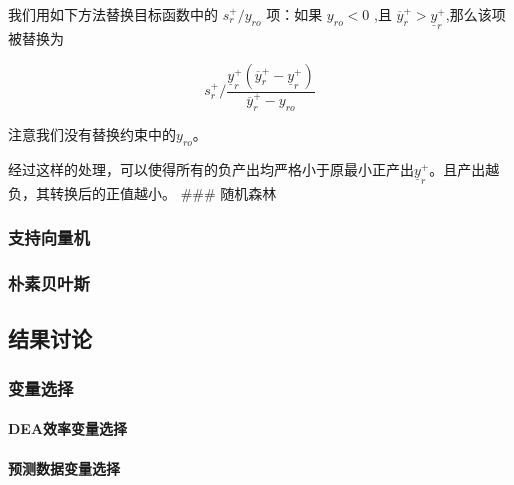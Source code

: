 \documentclass[]{article}
\begin{document}
我们用如下方法替换目标函数中的 $s_r^+/y_{ro}$ 项：如果 $y_{ro}<0$ ,且
$\overline{y}_{r}^{+}>\underline{y}_{r}^{+}$,那么该项被替换为

\[
s_r^{+}/\frac{\underline{y}_{r}^{+}(\overline{y}_{r}^{+}-\underline{y}_{r}^{+})}{\overline{y}_{r}^{+}-y_{ro}}
\]

注意我们没有替换约束中的$y_{ro}$。

经过这样的处理，可以使得所有的负产出均严格小于原最小正产出$\underline{y}_{r}^{+}$。且产出越负，其转换后的正值越小。
\#\#\# 随机森林

\subsubsection{支持向量机}

\subsubsection{朴素贝叶斯}

\subsection{结果讨论}

\subsubsection{变量选择}

\paragraph{DEA效率变量选择}\label{dea}

\paragraph{预测数据变量选择}

\subsubsection{}\label{section}
\end{document}
